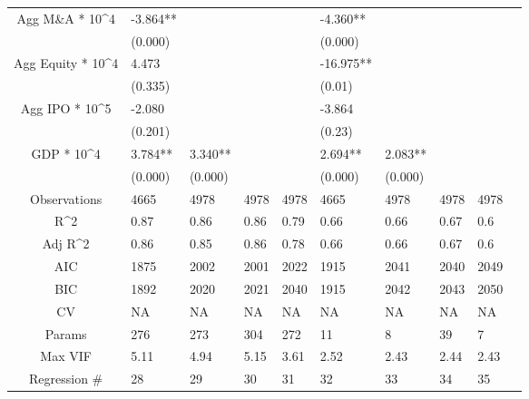 \documentclass{article}
\begin{document}
\begin{table}[H]
\begin{tabular}{|clllllllll|}
  Agg M\&A * 10^4 & -3.864** &  &  &  & -4.360** &  &  &  & \\
   & (0.000) &  &  &  & (0.000) &  &  &  & \\
  Agg Equity * 10^4 & 4.473 &  &  &  & -16.975** &  &  &  & \\
   & (0.335) &  &  &  & (0.01) &  &  &  & \\
  Agg IPO * 10^5 & -2.080 &  &  &  & -3.864 &  &  &  & \\
   & (0.201) &  &  &  & (0.23) &  &  &  & \\
  GDP * 10^4 & 3.784** & 3.340** &  &  & 2.694** & 2.083** &  &  & \\
   & (0.000) & (0.000) &  &  & (0.000) & (0.000) &  &  & \\
  \hline
 Observations & 4665 & 4978 & 4978 & 4978 & 4665 & 4978 & 4978 & 4978 & \\
  R^2 & 0.87 & 0.86 & 0.86 & 0.79 & 0.66 & 0.66 & 0.67 & 0.6 & \\
  Adj R^2 & 0.86 & 0.85 & 0.86 & 0.78 & 0.66 & 0.66 & 0.67 & 0.6 & \\
  AIC & 1875 & 2002 & 2001 & 2022 & 1915 & 2041 & 2040 & 2049 & \\
  BIC & 1892 & 2020 & 2021 & 2040 & 1915 & 2042 & 2043 & 2050 & \\
  CV & NA & NA & NA & NA & NA & NA & NA & NA & \\
  Params & 276 & 273 & 304 & 272 & 11 & 8 & 39 & 7 & \\
  Max VIF & 5.11 & 4.94 & 5.15 & 3.61 & 2.52 & 2.43 & 2.44 & 2.43 & \\
  Regression \# & 28 & 29 & 30 & 31 & 32 & 33 & 34 & 35 & \\
   \hline
\end{tabular}

\end{table}
\end{document}
